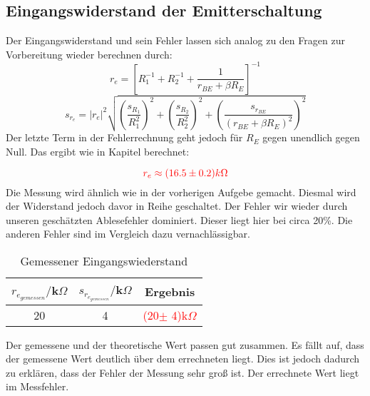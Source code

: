 \subsection{Eingangswiderstand der Emitterschaltung} \label{Eingspa}

Der Eingangswiderstand und sein Fehler lassen sich analog zu den Fragen zur Vorbereitung wieder berechnen durch:
\begin{equation*}
    r_e = [R_{1}^{-1}+R_{2}^{-1}+\frac{1}{r_{BE}+\beta R_E}]^{-1}
\end{equation*}
\begin{equation*}
    s_{r_e} = | r_e |^2 \sqrt{(\frac{s_{R_1}}{R_1^2})^2+(\frac{s_{R_2}}{R_2^2})^2+(\frac{s_{r_{BE}}}{(r_{BE}+\beta R_E)^2} )^2} 
\end{equation*}
Der letzte Term in der Fehlerrechnung geht jedoch für $R_E$ gegen unendlich gegen Null.
Das ergibt wie in Kapitel %
berechnet:

\begin{equation*}
    \textcolor{red}{r_e \approx	 (16.5 \pm 0.2)k\Omega}
\end{equation*}
Die Messung wird ähnlich wie in der vorherigen Aufgebe gemacht. Diesmal wird der Widerstand jedoch davor in Reihe geschaltet. Der Fehler wir wieder durch unseren geschätzten 
Ablesefehler dominiert. Dieser liegt hier bei circa 20\%. Die anderen Fehler sind im Vergleich dazu vernachlässigbar.
\begin{table}[h]
    \centering
    \begin{tabular}{c|c||c}
        $r_{e_{gemessen}}/$k$\Omega$ & $s_{r_{e_{gemessen}}}/$k$\Omega$ & Ergebnis\\
        \hline
        20 & 4 & \textcolor{red}{(20$\pm $ 4)k$\Omega$}
    \end{tabular}
    \caption{Gemessener Eingangswiederstand}
\end{table}

Der gemessene und der theoretische Wert passen gut zusammen. Es fällt auf, dass der gemessene Wert deutlich 
über dem errechneten liegt. Dies ist jedoch dadurch zu erklären, dass der Fehler der Messung sehr groß ist. 
Der errechnete Wert liegt im Messfehler.
